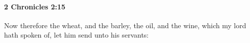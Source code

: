 
		\paragraph{2 Chronicles 2:15} %
			\label{2CHRONICLES-2-15}

			Now therefore the wheat, and the barley, the oil, and the wine, which my lord hath spoken of, let him send unto his servants:


